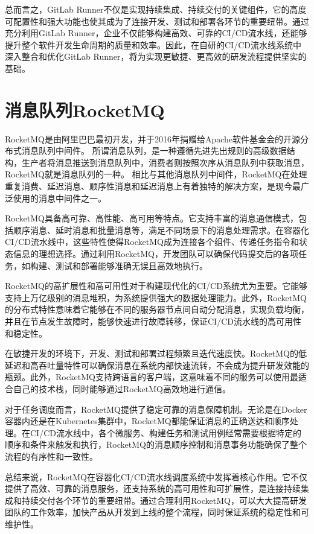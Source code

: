 总而言之，GitLab Runner不仅是实现持续集成、持续交付的关键组件，它的高度可配置性和强大功能也使其成为了连接开发、测试和部署各环节的重要纽带。通过充分利用GitLab Runner，企业不仅能够构建高效、可靠的CI/CD流水线，还能够提升整个软件开发生命周期的质量和效率。因此，在自研的CI/CD流水线系统中深入整合和优化GitLab Runner，将为实现更敏捷、更高效的研发流程提供坚实的基础。


\section{消息队列RocketMQ}
RocketMQ是由阿里巴巴最初开发，并于2016年捐赠给Apache软件基金会的开源分布式消息队列中间件。
所谓消息队列，是一种遵循先进先出规则的高级数据结构，生产者将消息推送到消息队列中，消费者则按照次序从消息队列中获取消息，RocketMQ就是消息队列的一种。
相比与其他消息队列中间件，RocketMQ在处理重复消费、延迟消息、顺序性消息和延迟消息上有着独特的解决方案，是现今最广泛使用的消息中间件之一\cite{分布式消息系统研究综述}。

RocketMQ具备高可靠、高性能、高可用等特点。它支持丰富的消息通信模式，包括顺序消息、延时消息和批量消息等，满足不同场景下的消息处理需求。在容器化CI/CD流水线中，这些特性使得RocketMQ成为连接各个组件、传递任务指令和状态信息的理想选择。通过利用RocketMQ，开发团队可以确保代码提交后的各项任务，如构建、测试和部署能够准确无误且高效地执行。

RocketMQ的高扩展性和高可用性对于构建现代化的CI/CD系统尤为重要。它能够支持上万亿级别的消息堆积，为系统提供强大的数据处理能力。此外，RocketMQ的分布式特性意味着它能够在不同的服务器节点间自动分配消息，实现负载均衡，并且在节点发生故障时，能够快速进行故障转移，保证CI/CD流水线的高可用性和稳定性。

在敏捷开发的环境下，开发、测试和部署过程频繁且迭代速度快。RocketMQ的低延迟和高吞吐量特性可以确保消息在系统内部快速流转，不会成为提升研发效能的瓶颈。此外，RocketMQ支持跨语言的客户端，这意味着不同的服务可以使用最适合自己的技术栈，同时能够通过RocketMQ高效地进行通信。

对于任务调度而言，RocketMQ提供了稳定可靠的消息保障机制。无论是在Docker容器内还是在Kubernetes集群中，RocketMQ都能保证消息的正确送达和顺序处理。在CI/CD流水线中，各个微服务、构建任务和测试用例经常需要根据特定的顺序和条件来触发和执行，RocketMQ的消息顺序控制和消息事务功能确保了整个流程的有序性和一致性。

总结来说，RocketMQ在容器化CI/CD流水线调度系统中发挥着核心作用。它不仅提供了高效、可靠的消息服务，还支持系统的高可用性和可扩展性，是连接持续集成和持续交付各个环节的重要纽带。通过合理利用RocketMQ，可以大大提高研发团队的工作效率，加快产品从开发到上线的整个流程，同时保证系统的稳定性和可维护性。

